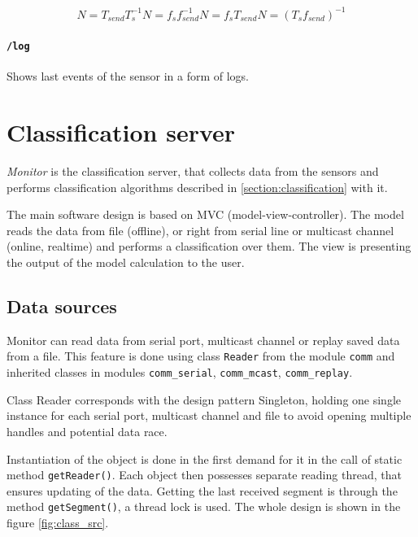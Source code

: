 \begin{subequations}
\begin{equation}
N = T_{send}T_s^{-1}
\end{equation}
\begin{equation}
N = f_sf_{send}^{-1}
\end{equation}
\begin{equation}
N = f_sT_{send}
\end{equation}
\begin{equation}
N = (T_sf_{send})^{-1}
\end{equation}
\label{eq:segmentsize}
\end{subequations}

\paragraph{\texttt{/log}}
Shows last events of the sensor in a form of logs.


\section{Classification server}
\label{chapter:serverImplementation}
{\it Monitor} is the classification server, that collects data from the sensors and performs
classification algorithms described in \ref{section:classification} with it.

The main software design is based on MVC (model-view-controller). The model reads the data from
file (offline), or right from serial line or multicast channel (online, realtime) and performs
a classification over them. The view is presenting the output of the model calculation to the user.

\subsection*{Data sources}
Monitor can read data from serial port, multicast channel or replay saved data from a file.
This feature is done using class \texttt{Reader} from the module \texttt{comm} and inherited classes
in modules \texttt{comm\_serial}, \texttt{comm\_mcast}, \texttt{comm\_replay}.

Class Reader corresponds with the design pattern Singleton, holding one single instance for each
serial port, multicast channel and file to avoid opening multiple handles and potential data race.

Instantiation of the object is done in the first demand for it in the call of static method \texttt{getReader()}.
Each object then possesses separate reading thread, that ensures updating of the data. Getting the last
received segment is through the method \texttt{getSegment()}, a thread lock is used. The whole design is shown
in the figure \ref{fig:class_src}.

